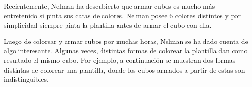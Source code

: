 \documentclass{oci}
\begin{document}
\begin{problemDescription}
\begin{center}
\begin{tikzpicture}[scale = 0.8]



\end{tikzpicture}
\end{center}

Recientemente, Nelman ha descubierto que armar cubos es mucho más entretenido si pinta sus caras
de colores.
Nelman posee 6 colores distintos y por simplicidad siempre pinta la plantilla antes de armar el cubo
con ella.

Luego de colorear y armar cubos por muchas horas, Nelman se ha dado cuenta de algo interesante.
Algunas veces, distintas formas de colorear la plantilla dan como resultado el mismo cubo.
Por ejemplo, a continuación se muestran dos formas distintas de colorear una plantilla, donde los cubos
armados a partir de estas son indistinguibles.


\end{problemDescription}
\end{document}
